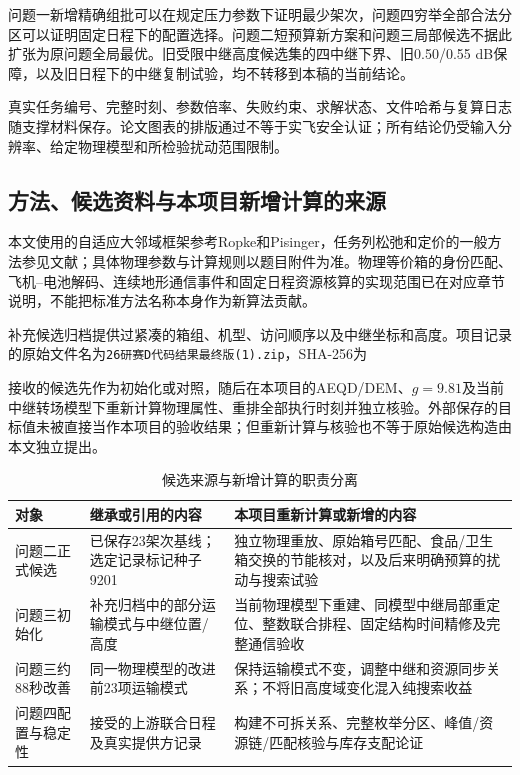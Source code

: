\documentclass[withoutpreface,colorprint]{format}
\numberwithin{equation}{section}
\numberwithin{figure}{section}
\numberwithin{table}{section}
\begin{document}
问题一新增精确组批可以在规定压力参数下证明最少架次，问题四穷举全部合法分区可以证明固定日程下的配置选择。问题二短预算新方案和问题三局部候选不据此扩张为原问题全局最优。旧受限中继高度候选集的四中继下界、旧0.50/0.55 dB保障，以及旧日程下的中继复制试验，均不转移到本稿的当前结论。

真实任务编号、完整时刻、参数倍率、失败约束、求解状态、文件哈希与复算日志随支撑材料保存。论文图表的排版通过不等于实飞安全认证；所有结论仍受输入分辨率、给定物理模型和所检验扰动范围限制。


\subsection{方法、候选资料与本项目新增计算的来源}
\label{app:source_provenance}
本文使用的自适应大邻域框架参考Ropke和Pisinger\cite{ropke2006alns}，任务列松弛和定价的一般方法参见文献\cite{barnhart1998branchprice}；具体物理参数与计算规则以题目附件为准。物理等价箱的身份匹配、飞机--电池解码、连续地形通信事件和固定日程资源核算的实现范围已在对应章节说明，不能把标准方法名称本身作为新算法贡献。

补充候选归档\cite{candidateArchive}提供过紧凑的箱组、机型、访问顺序以及中继坐标和高度。项目记录的原始文件名为\texttt{26研赛D代码结果最终版(1).zip}，SHA-256为
\begin{center}\begin{minipage}{.95\linewidth}\footnotesize{}\end{minipage}\end{center}
接收的候选先作为初始化或对照，随后在本项目的AEQD/DEM、$g=9.81$及当前中继转场模型下重新计算物理属性、重排全部执行时刻并独立核验。外部保存的目标值未被直接当作本项目的验收结果；但重新计算与核验也不等于原始候选构造由本文独立提出。

\begin{table}[htbp]\centering\small
\caption{候选来源与新增计算的职责分离}\label{tab:source_responsibility}
\begin{tabularx}{\linewidth}{p{3cm}XX}\toprule
对象 & 继承或引用的内容 & 本项目重新计算或新增的内容\\\midrule
问题二正式候选 & 已保存23架次基线；选定记录标记种子9201 & 独立物理重放、原始箱号匹配、食品/卫生箱交换的节能核对，以及后来明确预算的扰动与搜索试验\\
问题三初始化 & 补充归档中的部分运输模式与中继位置/高度 & 当前物理模型下重建、同模型中继局部重定位、整数联合排程、固定结构时间精修及完整通信验收\\
问题三约88秒改善 & 同一物理模型的改进前23项运输模式 & 保持运输模式不变，调整中继和资源同步关系；不将旧高度域变化混入纯搜索收益\\
问题四配置与稳定性 & 接受的上游联合日程及真实提供方记录 & 构建不可拆关系、完整枚举分区、峰值/资源链/匹配核验与库存支配论证\\\bottomrule
\end{tabularx}
\end{table}
\end{document}

